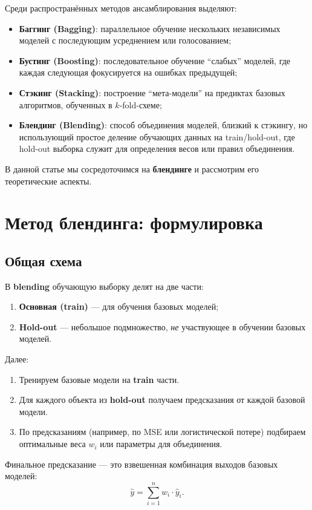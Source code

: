 Среди распространённых методов ансамблирования выделяют:
\begin{itemize}
    \item \textbf{Баггинг (Bagging)}: параллельное обучение нескольких независимых моделей с последующим усреднением или голосованием;
    \item \textbf{Бустинг (Boosting)}: последовательное обучение ``слабых'' моделей, где каждая следующая фокусируется на ошибках предыдущей;
    \item \textbf{Стэкинг (Stacking)}: построение ``мета-модели'' на предиктах базовых алгоритмов, обученных в $k$-fold-схеме;
    \item \textbf{Блендинг (Blending)}: способ объединения моделей, близкий к стэкингу, но использующий простое деление обучающих данных на train/hold-out, где hold-out выборка служит для определения весов или правил объединения.
\end{itemize}

В данной статье мы сосредоточимся на \textbf{блендинге} и рассмотрим его теоретические аспекты.

\section{Метод блендинга: формулировка}
\subsection{Общая схема}
В \textbf{blending} обучающую выборку делят на две части:
\begin{enumerate}
    \item \textbf{Основная (train)} --- для обучения базовых моделей;
    \item \textbf{Hold-out} --- небольшое подмножество, \textit{не} участвующее в обучении базовых моделей.
\end{enumerate}

Далее:
\begin{enumerate}
    \item Тренируем базовые модели на \textbf{train} части.
    \item Для каждого объекта из \textbf{hold-out} получаем предсказания от каждой базовой модели.
    \item По предсказаниям (например, по MSE или логистической потере) подбираем оптимальные веса $w_i$ или параметры для объединения.
\end{enumerate}

Финальное предсказание --- это взвешенная комбинация выходов базовых моделей:
\[
    \hat{y} = \sum_{i=1}^n w_i \cdot \hat{y}_i.
\]

